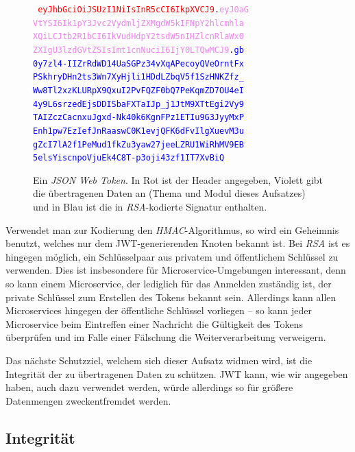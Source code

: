 \begin{figure}[b]
	\centering
	{\tt\footnotesize \textcolor{red}{
			eyJhbGciOiJSUzI1NiIsInR5cCI6IkpXVCJ9}.\textcolor{violet}{eyJ0aG\\
			VtYSI6Ik1pY3Jvc2VydmljZXMgdW5kIFNpY2hlcmhla\\
			XQiLCJtb2R1bCI6IkVudHdpY2tsdW5nIHZlcnRlaWx0\\
			ZXIgU3lzdGVtZSIsImt1cnNuciI6IjY0LTQwMCJ9}.\textcolor{blue}{gb\\
			0y7zl4-IIZrRdWD14UaSGPz34vXqAPecoyQVeOrntFx\\
			PSkhryDHn2ts3Wn7XyHjli1HDdLZbqV5f1SzHNKZfz\_\\
			Ww8Tl2xzKLURpX9QxuI2PvFQZF0bQ7PeKqmZD7OU4eI\\
			4y9L6srzedEjsDDISbaFXTaIJp\_j1JtM9XTtEgi2Vy9\\
			TAIZczCacnxuJgxd-Nk40k6KgnFPz1ETIu9G3JyyMxP\\
			Enh1pw7EzIefJnRaaswC0K1evjQFK6dFvIlgXuevM3u\\
			gZcI7lA2f1PeMud1fkZu3yaw27jeeLZRU1WiRhMV9EB\\
			5elsYiscnpoVjuEk4C8T-p3oji43zf1IT7XvBiQ}}
	\caption{Ein \textit{JSON Web Token}. In Rot ist der Header angegeben, Violett gibt die übertragenen Daten an (Thema und Modul dieses Aufsatzes) und in Blau ist die in \textit{RSA}-kodierte Signatur enthalten.}
	\label{fig:jwt}
\end{figure}

Verwendet man zur Kodierung den \textit{HMAC}-Algorithmus, so wird ein Geheimnis benutzt, welches nur dem JWT-generierenden Knoten bekannt ist. Bei \textit{RSA} ist es hingegen möglich, ein Schlüsselpaar aus privatem und öffentlichem Schlüssel zu verwenden. Dies ist insbesondere für Microservice-Umgebungen interessant, denn so kann einem Microservice, der lediglich für das Anmelden zuständig ist, der private Schlüssel zum Erstellen des Tokens bekannt sein. Allerdings kann allen Microservices hingegen der öffentliche Schlüssel vorliegen – so kann jeder Microservice beim Eintreffen einer Nachricht die Gültigkeit des Tokens überprüfen und im Falle einer Fälschung die Weiterverarbeitung verweigern.

Das nächste Schutzziel, welchem sich dieser Aufsatz widmen wird, ist die Integrität der zu übertragenen Daten zu schützen. JWT kann, wie wir angegeben haben, auch dazu verwendet werden, würde allerdings so für größere Datenmengen zweckentfremdet werden.


\subsection{Integrität}
\label{subsec:integrität}

